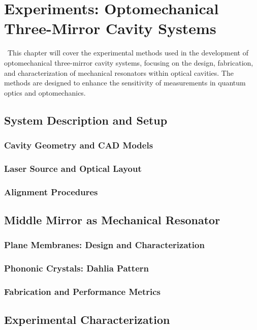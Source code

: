 

\chapter{Experiments: Optomechanical Three-Mirror Cavity Systems}\label{chap:squeezer}
\etocsettocstyle{\section*{\contentsname}}{}
\localtableofcontents\
This chapter will cover the experimental methods used in the development of optomechanical three-mirror cavity systems, focusing on the design, fabrication, and characterization of mechanical resonators within optical cavities. The methods are designed to enhance the sensitivity of measurements in quantum optics and optomechanics.
\section{System Description and Setup}
\subsection{Cavity Geometry and CAD Models}
\subsection{Laser Source and Optical Layout}
\subsection{Alignment Procedures}
\section{Middle Mirror as Mechanical Resonator}
\subsection{Plane Membranes: Design and Characterization}
\subsection{Phononic Crystals: Dahlia Pattern}
\subsection{Fabrication and Performance Metrics}
\section{Experimental Characterization}
